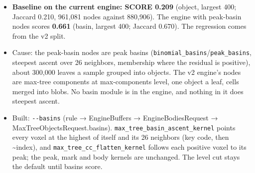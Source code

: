 \begin{enumerate}
\begin{itemize}
\item \textbf{Baseline on the current engine: SCORE 0.209} (object, largest 400; Jaccard 0.210, 961,081 nodes against 880,906). The engine with peak-basin nodes scores \textbf{0.661} (basin, largest 400; Jaccard 0.670). The regression comes from the v2 split.
\item Cause: the peak-basin nodes are peak basins (\texttt{binomial\_\allowbreak{}basins}/\texttt{peak\_\allowbreak{}basins}, steepest ascent over 26 neighbors, membership where the residual is positive), about 300,000 leaves a sample grouped into objects. The v2 engine's nodes are max-tree components at max-components level, one object a leaf, cells merged into blobs. No basin module is in the engine, and nothing in it does steepest ascent.
\item Built: \texttt{-\allowbreak{}-\allowbreak{}basins} (rule → EngineBuffers → EngineBodiesRequest → MaxTreeObjectsRequest.basins). \texttt{max\_\allowbreak{}tree\_\allowbreak{}basin\_\allowbreak{}ascent\_\allowbreak{}kernel} points every voxel at the highest of itself and its 26 neighbors (key code, then \textasciitilde{}index), and \texttt{max\_\allowbreak{}tree\_\allowbreak{}cc\_\allowbreak{}flatten\_\allowbreak{}kernel} follows each positive voxel to its peak; the peak, mark and body kernels are unchanged. The level cut stays the default until basins score.
\end{itemize}
\end{enumerate}

